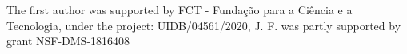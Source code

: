 \documentclass[aihp]{imsart}
\numberwithin{equation}{section}
\theoremstyle{plain}
\theoremstyle{remark}
\begin{document}
\begin{funding}
 The first author was supported by FCT - Funda\c c\~ao para a Ci\^encia e a Tecnologia, under the project: UIDB/04561/2020, J. F. was partly supported by grant NSF-DMS-1816408
\end{funding}



\end{document}

